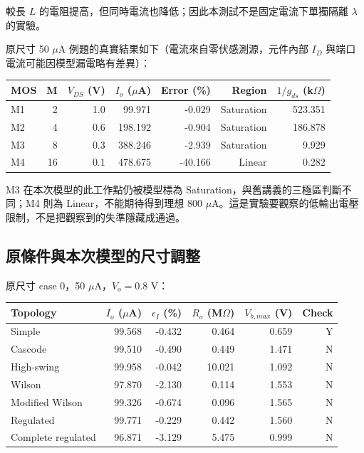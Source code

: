 較長 $L$ 的電阻提高，但同時電流也降低；因此本測試不是固定電流下單獨隔離 $\lambda$ 的實驗。

原尺寸 50 $\mu$A 例題的真實結果如下（電流來自零伏感測源，元件內部 $I_D$ 與端口電流可能因模型漏電略有差異）：

\begin{center}\small
\begin{tabular}{lrrrrrr}
\toprule
MOS & M & $V_{DS}$ (V) & $I_o$ ($\mu$A) & Error (\%) & Region & $1/g_{ds}$ (k$\Omega$) \\
\midrule
M1 & 2 & 1.0 & 99.971 & -0.029 & Saturation & 523.351 \\
M2 & 4 & 0.6 & 198.192 & -0.904 & Saturation & 186.878 \\
M3 & 8 & 0.3 & 388.246 & -2.939 & Saturation & 9.929 \\
M4 & 16 & 0.1 & 478.675 & -40.166 & Linear & 0.282 \\
\bottomrule
\end{tabular}
\end{center}

M3 在本次模型的此工作點仍被模型標為 Saturation，與舊講義的三極區判斷不同；M4 則為 Linear，不能期待得到理想 800 $\mu$A。這是實驗要觀察的低輸出電壓限制，不是把觀察到的失準隱藏成通過。

\subsection{原條件與本次模型的尺寸調整}
原尺寸 case 0，50 $\mu$A，$V_o=0.8$ V：

\begin{center}\small
\begin{tabular}{lrrrrr}
\toprule
Topology & $I_o$ ($\mu$A) & $\epsilon_I$ (\%) & $R_o$ (M$\Omega$) & $V_{b,max}$ (V) & Check \\
\midrule
Simple & 99.568 & -0.432 & 0.464 & 0.659 & Y \\
Cascode & 99.510 & -0.490 & 0.449 & 1.471 & N \\
High-swing & 99.958 & -0.042 & 10.021 & 1.092 & N \\
Wilson & 97.870 & -2.130 & 0.114 & 1.553 & N \\
Modified Wilson & 99.326 & -0.674 & 0.096 & 1.565 & N \\
Regulated & 99.771 & -0.229 & 0.442 & 1.560 & N \\
Complete regulated & 96.871 & -3.129 & 5.475 & 0.999 & N \\
\bottomrule
\end{tabular}
\end{center}

